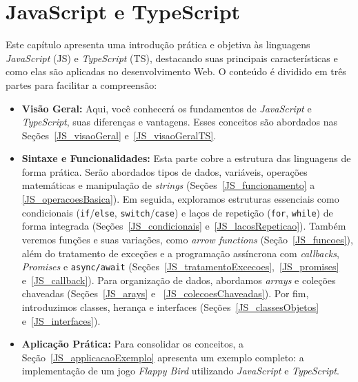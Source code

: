 \chapter{JavaScript e TypeScript}
\thispagestyle{empty} 
\label{cap:js-ts} 


Este capítulo apresenta uma introdução prática e objetiva às linguagens \textit{JavaScript} (JS) e \textit{TypeScript} (TS), destacando suas principais características e como elas são aplicadas no desenvolvimento Web. O conteúdo é dividido em três partes para facilitar a compreensão:

\begin{itemize}
  \item \textbf{Visão Geral:} Aqui, você conhecerá os fundamentos de \textit{JavaScript} e \textit{TypeScript}, suas diferenças e vantagens. Esses conceitos são abordados nas Seções~\ref{JS_visaoGeral} e~\ref{JS_visaoGeralTS}.

  \item \textbf{Sintaxe e Funcionalidades:} Esta parte cobre a estrutura das linguagens de forma prática. Serão abordados tipos de dados, variáveis, operações matemáticas e manipulação de \textit{strings} (Seções~\ref{JS_funcionamento} a \ref{JS_operacoesBasica}). Em seguida, exploramos estruturas essenciais como condicionais (\texttt{if}/\texttt{else}, \texttt{switch}/\texttt{case}) e laços de repetição (\texttt{for}, \texttt{while}) de forma integrada (Seções~\ref{JS_condicionais} e~\ref{JS_lacosRepeticao}).   Também veremos funções e suas variações, como \textit{arrow functions} (Seção~\ref{JS_funcoes}), além do tratamento de exceções e a programação assíncrona com \textit{callbacks}, \textit{Promises} e \texttt{async/await} (Seções~\ref{JS_tratamentoExcecoes},~\ref{JS_promises} e~\ref{JS_callback}). Para organização de dados, abordamos \textit{arrays} e coleções chaveadas (Seções~\ref{JS_arays} e ~\ref{JS_colecoesChaveadas}). Por fim, introduzimos classes, herança e interfaces (Seções~\ref{JS_classesObjetos} e~\ref{JS_interfaces}).

  \item \textbf{Aplicação Prática:} Para consolidar os conceitos, a Seção~\ref{JS_applicacaoExemplo} apresenta um exemplo completo: a implementação de um jogo \textit{Flappy Bird} utilizando \textit{JavaScript} e \textit{TypeScript}.
\end{itemize}




